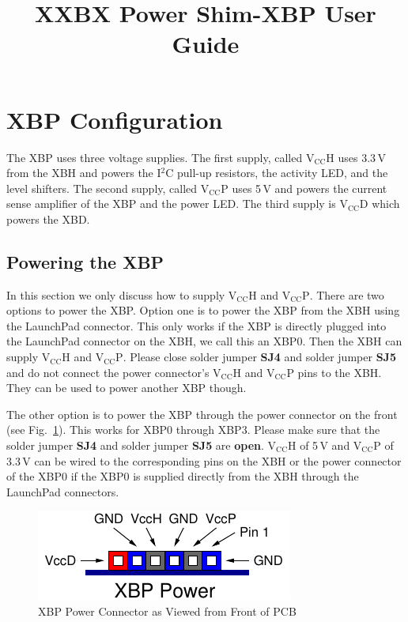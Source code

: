\documentclass{article}
\begin{document}
\title{XXBX Power Shim-XBP User Guide}

\maketitle

\section{XBP Configuration}
The XBP uses three voltage supplies. The first supply, called $\mathrm{V_{CC}H}$
uses 3.3\,V from the XBH and powers the I$^2$C pull-up resistors, the activity LED, 
and the level shifters.
The second supply, called $\mathrm{V_{CC}P}$ uses 5\,V and powers the current
sense amplifier of the XBP and the power LED. 
The third supply is $\mathrm{V_{CC}D}$ which powers the XBD.

\subsection{Powering the XBP}
In this section we only discuss how to supply $\mathrm{V_{CC}H}$ and $\mathrm{V_{CC}P}$.
There are two options to power the XBP. Option one is to power the XBP from the
XBH using the LaunchPad connector. This only works if the XBP is directly plugged into the 
LaunchPad connector on the XBH, 
we call this an XBP0. Then the XBH can supply $\mathrm{V_{CC}H}$ and $\mathrm{V_{CC}P}$.
Please close solder jumper \textbf{SJ4} and solder jumper \textbf{SJ5} and do not connect
the power connector's $\mathrm{V_{CC}H}$ and $\mathrm{V_{CC}P}$ pins to the XBH. 
They can be used to power another XBP though.

The other option is to power the XBP through the power connector on the front 
(see Fig.~\ref{fig:power}). This works for XBP0 through XBP3. Please make sure that the
solder jumper \textbf{SJ4} and solder jumper \textbf{SJ5} are \textbf{open}. 
$\mathrm{V_{CC}H}$ of 5\,V and $\mathrm{V_{CC}P}$ of 3.3\,V can be wired to the 
corresponding pins on the XBH or the power connector of the XBP0 if the XBP0 is supplied directly from the
XBH through the LaunchPad connectors.


\begin{figure}[ht]
  \begin{center}
    \includegraphics[scale=1]{figures/xbp_power}
    \caption{XBP Power Connector as Viewed from Front of PCB}\label{fig:power}
  \end{center}
\end{figure}
\end{document}
